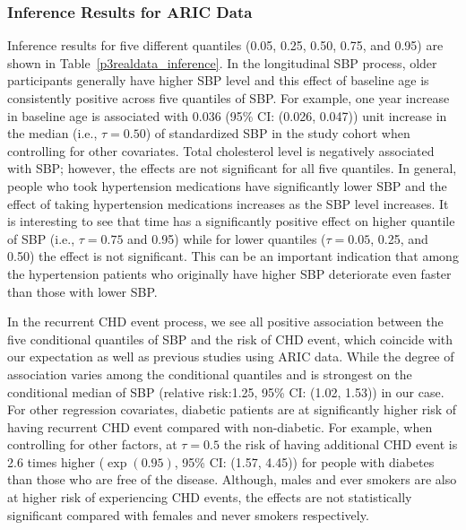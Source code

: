 \subsubsection{Inference Results for ARIC Data}\label{sec:p3data_inference}
Inference results for five different quantiles (0.05, 0.25, 0.50, 0.75, and 0.95) are shown in Table~\ref{p3realdata_inference}. In the longitudinal SBP process, older participants generally have higher SBP level and this effect of baseline age is consistently positive across five quantiles of SBP. For example, one year increase in baseline age is associated with 0.036 (95\% CI: (0.026, 0.047)) unit increase in the median (i.e., $\tau=0.50$) of standardized SBP in the study cohort when controlling for other covariates. Total cholesterol level is negatively associated with SBP; however, the effects are not significant for all five quantiles. In general, people who took hypertension medications have significantly lower SBP and the effect of taking hypertension medications increases as the SBP level increases. It is interesting to see that time has a significantly positive effect on higher quantile of SBP (i.e., $\tau=0.75$ and 0.95) while for lower quantiles ($\tau=0.05$, 0.25, and 0.50) the effect is not significant. This can be an important indication that among the hypertension patients who originally have higher SBP deteriorate even faster than those with lower SBP.

In the recurrent CHD event process, we see all positive association between the five conditional quantiles of SBP and the risk of CHD event, which coincide with our expectation as well as previous studies using ARIC data. While the degree of association varies among the conditional quantiles and is strongest on the conditional median of SBP (relative risk:1.25, 95\% CI: (1.02, 1.53)) in our case. For other regression covariates, diabetic patients are at significantly higher risk of having recurrent CHD event compared with non-diabetic. For example, when controlling for other factors, at $\tau=0.5$ the risk of having additional CHD event is 2.6 times higher ($\exp(0.95)$, 95\% CI: (1.57, 4.45)) for people with diabetes than those who are free of the disease. Although, males and ever smokers are also at higher risk of experiencing CHD events, the effects are not statistically significant compared with females and never smokers respectively.

